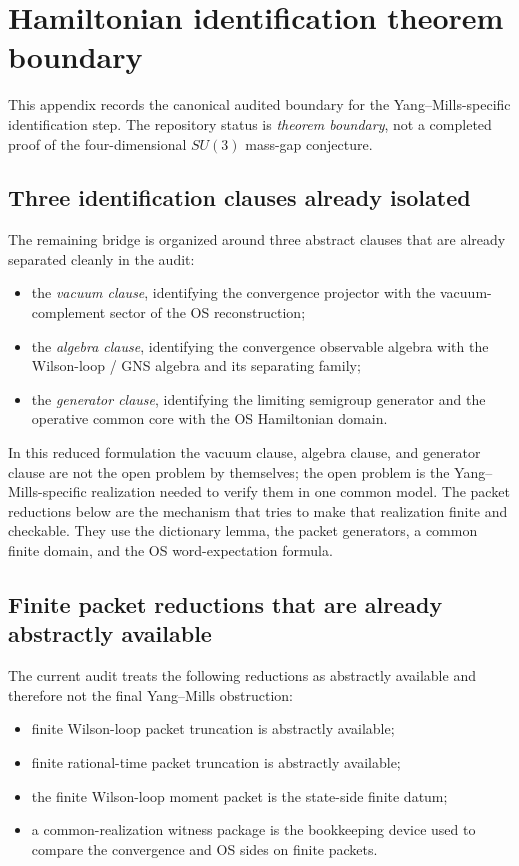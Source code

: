 \section*{Hamiltonian identification theorem boundary}
\label{sec:hamiltonian-identification-boundary}

This appendix records the canonical audited boundary for the Yang--Mills-specific
identification step. The repository status is \emph{theorem boundary}, not a
completed proof of the four-dimensional $SU(3)$ mass-gap conjecture.

\subsection*{Three identification clauses already isolated}
The remaining bridge is organized around three abstract clauses that are already
separated cleanly in the audit:
\begin{itemize}
\item the \emph{vacuum clause}, identifying the convergence projector with the
vacuum-complement sector of the OS reconstruction;
\item the \emph{algebra clause}, identifying the convergence observable algebra
with the Wilson-loop / GNS algebra and its separating family;
\item the \emph{generator clause}, identifying the limiting semigroup generator
and the operative common core with the OS Hamiltonian domain.
\end{itemize}
In this reduced formulation the vacuum clause, algebra clause, and generator
clause are not the open problem by themselves; the open problem is the
Yang--Mills-specific realization needed to verify them in one common model.
The packet reductions below are the mechanism that tries to make that
realization finite and checkable. They use the dictionary lemma, the packet
generators, a common finite domain, and the OS word-expectation formula.

\subsection*{Finite packet reductions that are already abstractly available}
The current audit treats the following reductions as abstractly available and
therefore not the final Yang--Mills obstruction:
\begin{itemize}
\item finite Wilson-loop packet truncation is abstractly available;
\item finite rational-time packet truncation is abstractly available;
\item the finite Wilson-loop moment packet is the state-side finite datum;
\item a common-realization witness package is the bookkeeping device used to
compare the convergence and OS sides on finite packets.
\end{itemize}

